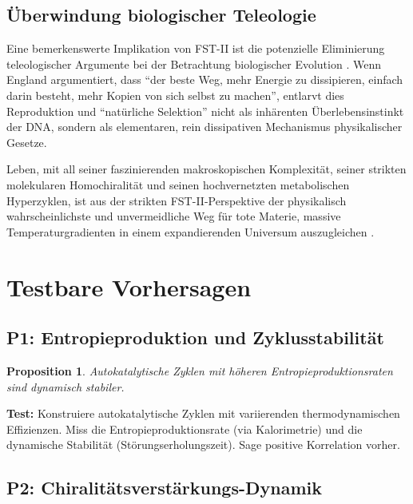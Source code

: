 \documentclass[12pt,a4paper]{article}
\newtheorem{proposition}{Proposition}
\theoremstyle{remark}
\begin{document}
\subsection{\"Uberwindung biologischer Teleologie}

Eine bemerkenswerte Implikation von FST-II ist die potenzielle Eliminierung teleologischer Argumente bei der Betrachtung biologischer Evolution \citep{UnbecomingBeing}. Wenn England argumentiert, dass ``der beste Weg, mehr Energie zu dissipieren, einfach darin besteht, mehr Kopien von sich selbst zu machen'', entlarvt dies Reproduktion und ``nat\"urliche Selektion'' nicht als inh\"arenten \"Uberlebensinstinkt der DNA, sondern als elementaren, rein dissipativen Mechanismus physikalischer Gesetze.

Leben, mit all seiner faszinierenden makroskopischen Komplexit\"at, seiner strikten molekularen Homochiralit\"at und seinen hochvernetzten metabolischen Hyperzyklen, ist aus der strikten FST-II-Perspektive der physikalisch wahrscheinlichste und unvermeidliche Weg f\"ur tote Materie, massive Temperaturgradienten in einem expandierenden Universum auszugleichen \citep{Bioenergetics}.

\section{Testbare Vorhersagen}
\label{sec:predictions}

\subsection{P1: Entropieproduktion und Zyklusstabilit\"at}

\begin{proposition}
Autokatalytische Zyklen mit h\"oheren Entropieproduktionsraten sind dynamisch stabiler.
\end{proposition}

\textbf{Test:} Konstruiere autokatalytische Zyklen mit variierenden thermodynamischen Effizienzen. Miss die Entropieproduktionsrate (via Kalorimetrie) und die dynamische Stabilit\"at (St\"orungserholungszeit). Sage positive Korrelation vorher.

\subsection{P2: Chiralit\"atsverst\"arkungs-Dynamik}
\end{document}
